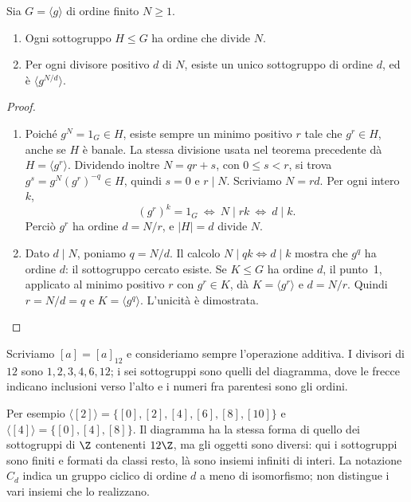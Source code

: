 \begin{teorema}\label{teo:ciclici-divisori}
Sia $G=\langle g\rangle$ di ordine finito $N\ge1$.
\begin{enumerate}[label=\arabic*.]
\item Ogni sottogruppo $H\le G$ ha ordine che divide $N$.
\item Per ogni divisore positivo $d$ di $N$, esiste un unico sottogruppo di ordine $d$, ed è $\langle g^{N/d}\rangle$.
\end{enumerate}
\end{teorema}
\begin{proof}
\begin{enumerate}[label=\arabic*.]
\item Poiché $g^N=1_G\in H$, esiste sempre un minimo positivo $r$ tale che $g^r\in H$, anche se $H$ è banale. La stessa divisione usata nel teorema precedente dà $H=\langle g^r\rangle$. Dividendo inoltre $N=qr+s$, con $0\le s<r$, si trova $g^s=g^N(g^r)^{-q}\in H$, quindi $s=0$ e $r\mid N$. Scriviamo $N=r d$. Per ogni intero $k$,
\[
(g^r)^k=1_G\ \Longleftrightarrow\ N\mid rk
\ \Longleftrightarrow\ d\mid k.
\]
Perciò $g^r$ ha ordine $d=N/r$, e $|H|=d$ divide $N$.
\item Dato $d\mid N$, poniamo $q=N/d$. Il calcolo $N\mid qk\Longleftrightarrow d\mid k$ mostra che $g^q$ ha ordine $d$: il sottogruppo cercato esiste. Se $K\le G$ ha ordine $d$, il punto~1, applicato al minimo positivo $r$ con $g^r\in K$, dà $K=\langle g^r\rangle$ e $d=N/r$. Quindi $r=N/d=q$ e $K=\langle g^q\rangle$. L'unicità è dimostrata.
\end{enumerate}
\end{proof}

\begin{esempio}[Il reticolo di $\Z/12\Z$]
Scriviamo $[a]=[a]_{12}$ e consideriamo sempre l'operazione additiva. I divisori di $12$ sono $1,2,3,4,6,12$; i sei sottogruppi sono quelli del diagramma, dove le frecce indicano inclusioni verso l'alto e i numeri fra parentesi sono gli ordini.
\begin{center}
\end{center}
Per esempio $\langle[2]\rangle=\{[0],[2],[4],[6],[8],[10]\}$ e $\langle[4]\rangle=\{[0],[4],[8]\}$. Il diagramma ha la stessa forma di quello dei sottogruppi di $\Z$ contenenti $12\Z$, ma gli oggetti sono diversi: qui i sottogruppi sono finiti e formati da classi resto, là sono insiemi infiniti di interi. La notazione $C_d$ indica un gruppo ciclico di ordine $d$ a meno di isomorfismo; non distingue i vari insiemi che lo realizzano.
\end{esempio}

